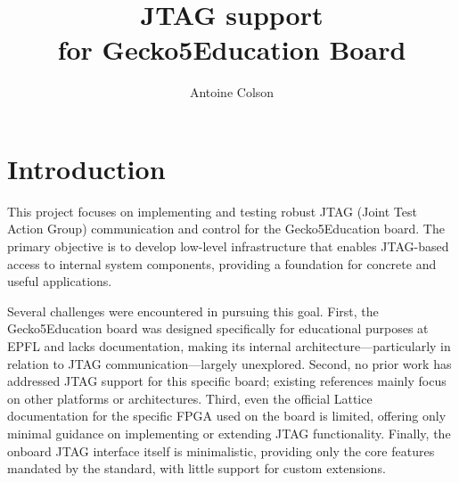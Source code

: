 \documentclass[a4paper,11pt,oneside]{report}
\title{JTAG support \\for Gecko5Education Board}
\author{Antoine Colson}
\newcommand{\boardName}{Gecko5Education \xspace}
\begin{document}
\maketitle




\maketoc

\chapter{Introduction}

This project focuses on implementing and testing robust JTAG (Joint Test Action Group) communication and control for the \boardName board.
The primary objective is to develop low-level infrastructure that enables JTAG-based access to internal system components, providing a foundation for concrete and useful applications.

Several challenges were encountered in pursuing this goal.
First, the \boardName board was designed specifically for educational purposes at EPFL and lacks documentation, 
making its internal architecture—particularly in relation to JTAG communication—largely unexplored.
Second, no prior work has addressed JTAG support for this specific board; existing references mainly focus on other platforms or architectures.
Third, even the official Lattice documentation for the specific FPGA used on the board is limited, 
offering only minimal guidance on implementing or extending JTAG functionality.
Finally, the onboard JTAG interface itself is minimalistic, 
providing only the core features mandated by the standard, with little support for custom extensions.
\end{document}
